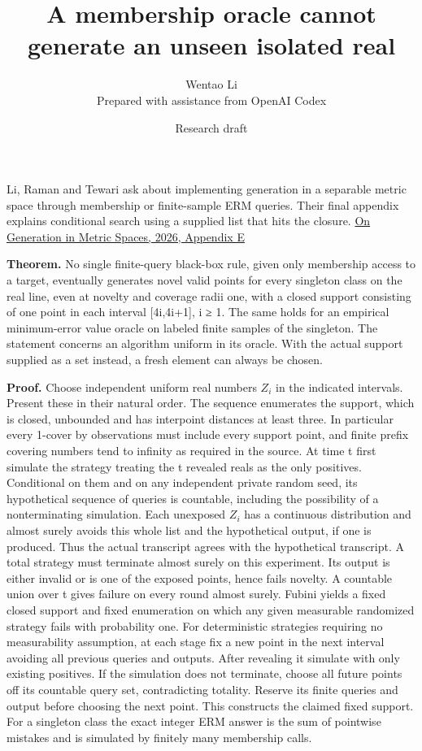 \documentclass[11pt]{article}
\title{A membership oracle cannot generate an unseen isolated real}
\author{Wentao Li\\{\small Prepared with assistance from OpenAI Codex}}
\date{Research draft}
\begin{document}
\maketitle
Li, Raman and Tewari ask about implementing generation in a separable metric space through membership or finite-sample ERM queries. Their final appendix explains conditional search using a supplied list that hits the closure. \href{https://arxiv.org/abs/2602.07710v2}{On Generation in Metric Spaces, 2026, Appendix E}

\textbf{Theorem.} No single finite-query black-box rule, given only membership access to a target, eventually generates novel valid points for every singleton class on the real line, even at novelty and coverage radii one, with a closed support consisting of one point in each interval {[}4i,4i+1{]}, i ≥ 1. The same holds for an empirical minimum-error value oracle on labeled finite samples of the singleton. The statement concerns an algorithm uniform in its oracle. With the actual support supplied as a set instead, a fresh element can always be chosen.

\textbf{Proof.} Choose independent uniform real numbers \(Z_{i}\) in the indicated intervals. Present these in their natural order. The sequence enumerates the support, which is closed, unbounded and has interpoint distances at least three. In particular every 1-cover by observations must include every support point, and finite prefix covering numbers tend to infinity as required in the source. At time t first simulate the strategy treating the t revealed reals as the only positives. Conditional on them and on any independent private random seed, its hypothetical sequence of queries is countable, including the possibility of a nonterminating simulation. Each unexposed \(Z_{i}\) has a continuous distribution and almost surely avoids this whole list and the hypothetical output, if one is produced. Thus the actual transcript agrees with the hypothetical transcript. A total strategy must terminate almost surely on this experiment. Its output is either invalid or is one of the exposed points, hence fails novelty. A countable union over t gives failure on every round almost surely. Fubini yields a fixed closed support and fixed enumeration on which any given measurable randomized strategy fails with probability one. For deterministic strategies requiring no measurability assumption, at each stage fix a new point in the next interval avoiding all previous queries and outputs. After revealing it simulate with only existing positives. If the simulation does not terminate, choose all future points off its countable query set, contradicting totality. Reserve its finite queries and output before choosing the next point. This constructs the claimed fixed support. For a singleton class the exact integer ERM answer is the sum of pointwise mistakes and is simulated by finitely many membership calls.
\end{document}
